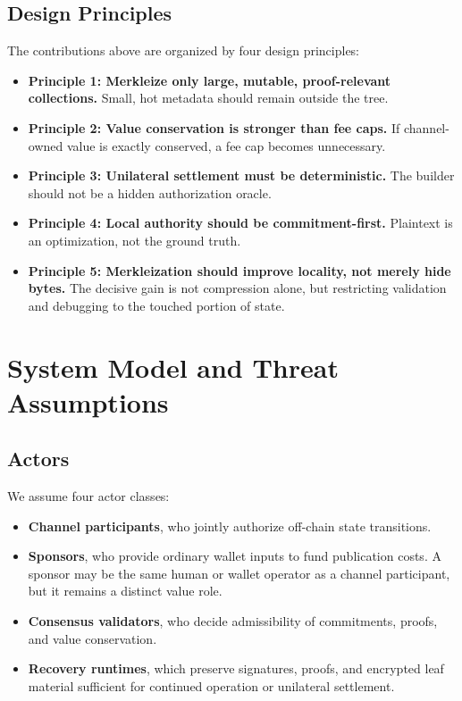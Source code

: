 \documentclass[11pt,a4paper]{article}
\begin{document}
\subsection{Design Principles}

The contributions above are organized by four design principles:
\begin{itemize}
    \item \textbf{Principle 1: Merkleize only large, mutable, proof-relevant collections.} Small, hot metadata should remain outside the tree.
    \item \textbf{Principle 2: Value conservation is stronger than fee caps.} If channel-owned value is exactly conserved, a fee cap becomes unnecessary.
    \item \textbf{Principle 3: Unilateral settlement must be deterministic.} The builder should not be a hidden authorization oracle.
    \item \textbf{Principle 4: Local authority should be commitment-first.} Plaintext is an optimization, not the ground truth.
    \item \textbf{Principle 5: Merkleization should improve locality, not merely hide bytes.} The decisive gain is not compression alone, but restricting validation and debugging to the touched portion of state.
\end{itemize}

\section{System Model and Threat Assumptions}

\subsection{Actors}

We assume four actor classes:
\begin{itemize}
    \item \textbf{Channel participants}, who jointly authorize off-chain state transitions.
    \item \textbf{Sponsors}, who provide ordinary wallet inputs to fund publication costs. A sponsor may be the same human or wallet operator as a channel participant, but it remains a distinct value role.
    \item \textbf{Consensus validators}, who decide admissibility of commitments, proofs, and value conservation.
    \item \textbf{Recovery runtimes}, which preserve signatures, proofs, and encrypted leaf material sufficient for continued operation or unilateral settlement.
\end{itemize}
\end{document}
